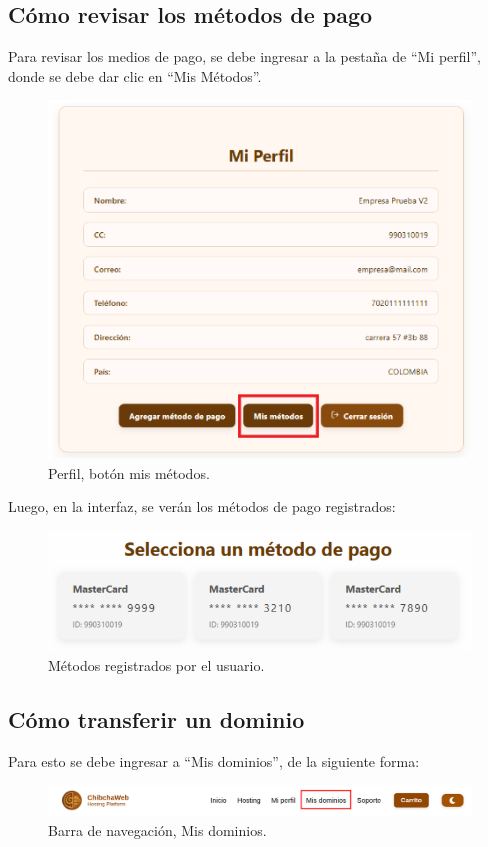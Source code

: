 \subsection{Cómo revisar los métodos de pago}
Para revisar los medios de pago, se debe ingresar a la pestaña de “Mi perfil”, donde se debe dar clic en “Mis Métodos”.

\begin{figure}[H]
    \centering
\includegraphics[width=0.6\linewidth]{casosuso/perfil-mismetodos.png}
\caption{Perfil, botón mis métodos.}
\label{fig:perfil-mismetodos}
\end{figure}

Luego, en la interfaz, se verán los métodos de pago registrados:

\begin{figure}[H]
    \centering
\includegraphics[width=0.8\linewidth]{casosuso/mismetodos.png}
\caption{Métodos registrados por el usuario.}
\label{fig:mismetodos}
\end{figure}

\subsection{Cómo transferir un dominio}
Para esto se debe ingresar a “Mis dominios”, de la siguiente forma:

\begin{figure}[H]
    \centering
\includegraphics[width=0.8\linewidth]{casosuso/navbar-misdominios.png}
\caption{Barra de navegación, Mis dominios.}
\label{fig:navbar-misdominios}
\end{figure}

